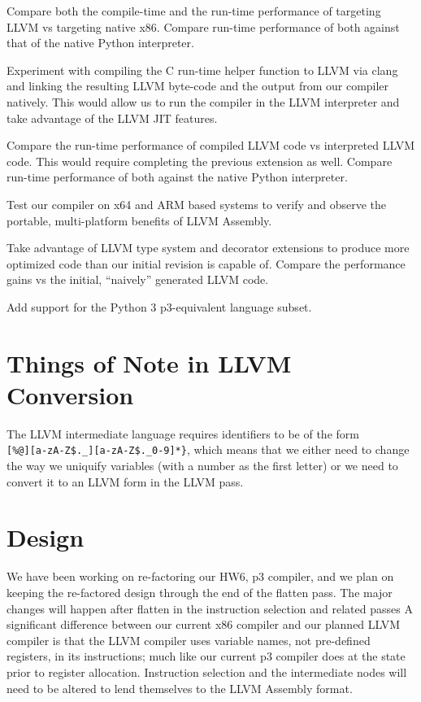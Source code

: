 \documentclass[11pt]{article}
\newenvironment{packed_enum}{
\begin{enumerate}
  \setlength{\itemsep}{1pt}
  \setlength{\parskip}{0pt}
  \setlength{\parsep}{0pt}
}{\end{enumerate}}
\newenvironment{packed_item}{
\begin{itemize}
  \setlength{\itemsep}{1pt}
  \setlength{\parskip}{0pt}
  \setlength{\parsep}{0pt}
}{\end{itemize}}
\begin{document}
\begin{packed_item}
\item Compare both the compile-time and the run-time performance of
  targeting LLVM vs targeting native x86. Compare run-time performance
  of both against that of the native Python interpreter.
\item Experiment with compiling the C run-time helper function to LLVM
  via clang\cite{clang.llvm.org}
  and linking the resulting LLVM byte-code and the output
  from our compiler natively. This would allow us to run the compiler
  in the LLVM interpreter and take advantage of the LLVM JIT features.
\item Compare the run-time performance of compiled LLVM code vs
  interpreted LLVM code. This would require completing the previous
  extension as well. Compare run-time performance
  of both against the native Python interpreter.
\item Test our compiler on x64 and ARM based systems to verify and
  observe the portable, multi-platform benefits of LLVM Assembly.
\item Take advantage of LLVM type system and decorator extensions to
  produce more optimized code than our initial revision is capable of.
  Compare the performance gains vs the initial, ``naively'' generated
  LLVM code.
\item Add support for the Python 3 p3-equivalent language subset.
\end{packed_item}

\section{Things of Note in LLVM Conversion}
\begin{packed_enum}
\item The LLVM intermediate language requires identifiers to be of the form\\
\verb+[%@][a-zA-Z$._][a-zA-Z$._0-9]*}+, which means that we either need to
change the way we uniquify variables (with a number as the first letter) or
we need to convert it to an LLVM form in the LLVM pass.
\end{packed_enum}


\section{Design}

We have been working on re-factoring our HW6, p3 compiler,
and we plan on keeping
the re-factored design through the end of the flatten pass. The major
changes will happen after flatten in the instruction selection and related passes
A significant difference between our current x86
compiler and our planned LLVM compiler is that the LLVM compiler
uses variable names, not pre-defined registers, in its instructions;
much like our current p3
compiler does at the state prior to register allocation. Instruction
selection and the intermediate nodes will need to be altered to lend
themselves to the LLVM Assembly format.
\end{document}
